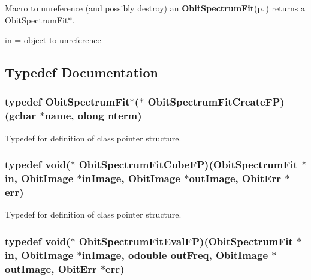 Macro to unreference (and possibly destroy) an {\bf Obit\-Spectrum\-Fit}{\rm (p.\,\pageref{structObitSpectrumFit})} returns a Obit\-Spectrum\-Fit$\ast$. 

in = object to unreference 

\subsection{Typedef Documentation}
\subsubsection{\setlength{\rightskip}{0pt plus 5cm}typedef {\bf Obit\-Spectrum\-Fit}$\ast$($\ast$ {\bf Obit\-Spectrum\-Fit\-Create\-FP})(gchar $\ast$name, {\bf olong} nterm)}\label{ObitSpectrumFit_8h_a3}


Typedef for definition of class pointer structure. 

\subsubsection{\setlength{\rightskip}{0pt plus 5cm}typedef void($\ast$ {\bf Obit\-Spectrum\-Fit\-Cube\-FP})({\bf Obit\-Spectrum\-Fit} $\ast$in, {\bf Obit\-Image} $\ast$in\-Image, {\bf Obit\-Image} $\ast$out\-Image, {\bf Obit\-Err} $\ast$err)}\label{ObitSpectrumFit_8h_a4}


Typedef for definition of class pointer structure. 

\subsubsection{\setlength{\rightskip}{0pt plus 5cm}typedef void($\ast$ {\bf Obit\-Spectrum\-Fit\-Eval\-FP})({\bf Obit\-Spectrum\-Fit} $\ast$in, {\bf Obit\-Image} $\ast$in\-Image, {\bf odouble} out\-Freq, {\bf Obit\-Image} $\ast$out\-Image, {\bf Obit\-Err} $\ast$err)}\label{ObitSpectrumFit_8h_a6}


